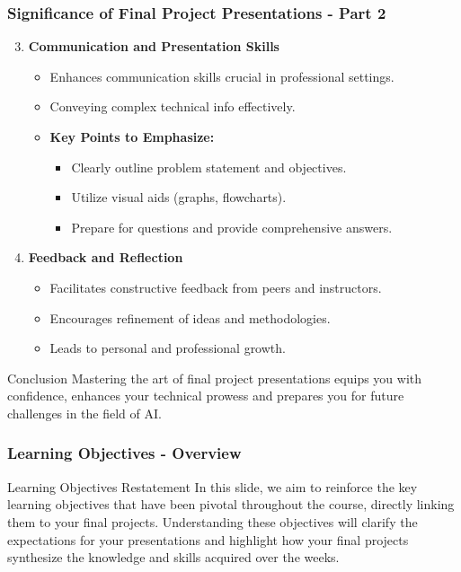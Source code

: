 \documentclass{beamer}
\begin{document}
\begin{frame}[fragile]
    \frametitle{Significance of Final Project Presentations - Part 2}
    \begin{enumerate}
        \setcounter{enumi}{2}
        \item \textbf{Communication and Presentation Skills}
        \begin{itemize}
            \item Enhances communication skills crucial in professional settings.
            \item Conveying complex technical info effectively.
            \item \textbf{Key Points to Emphasize:}
            \begin{itemize}
                \item Clearly outline problem statement and objectives.
                \item Utilize visual aids (graphs, flowcharts).
                \item Prepare for questions and provide comprehensive answers.
            \end{itemize}
        \end{itemize}

        \item \textbf{Feedback and Reflection}
        \begin{itemize}
            \item Facilitates constructive feedback from peers and instructors.
            \item Encourages refinement of ideas and methodologies.
            \item Leads to personal and professional growth.
        \end{itemize}
    \end{enumerate}
    
    \begin{block}{Conclusion}
        Mastering the art of final project presentations equips you with confidence, enhances your technical prowess and prepares you for future challenges in the field of AI.
    \end{block}
\end{frame}

\begin{frame}[fragile]
    \frametitle{Learning Objectives - Overview}
    \begin{block}{Learning Objectives Restatement}
        In this slide, we aim to reinforce the key learning objectives that have been pivotal throughout the course, directly linking them to your final projects. Understanding these objectives will clarify the expectations for your presentations and highlight how your final projects synthesize the knowledge and skills acquired over the weeks.
    \end{block}
\end{frame}
\end{document}
